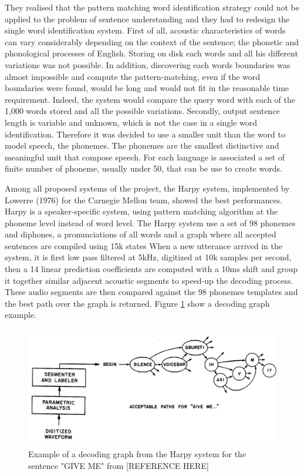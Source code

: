 They realised that the pattern matching word identification strategy could not be applied to the problem of sentence understanding and they had to redesign the single word identification system. First of all, acoustic characteristics of words can vary considerably depending on the context of the sentence; the phonetic and phonological processes of English. Storing on disk each  words and all his different variations was not possible. In addition, discovering each words boundaries was almost impossible and compute the pattern-matching, even if the word boundaries were found, would be long and would not fit in the reasonable time requirement. Indeed, the system would compare the query word with each of the 1,000 words stored and all the possible variations. Secondly, output sentence length is variable and unknown, which is not the case in a single word identification. Therefore it was decided to use a smaller unit than the word to model speech, the phonemes. The phonemes are the smallest distinctive and meaningful unit that compose speech. For each language is associated a set of finite number of phoneme, usually under 50, that can be use to create words.

Among all proposed systems of the project, the Harpy system, implemented by Lowerre (1976) for the Carnegie Mellon team, showed the best performances. Harpy is a speaker-specific  system, using pattern matching algorithm at the phoneme level instead of word level. The Harpy system  use a set of 98 phonemes and diphones, a pronunciations of all words and a graph where all accepted sentences are compiled using 15k states  When a new utterance arrived in the system, it is first low pass filtered at 5kHz, digitized at 10k samples per second, then a 14 linear prediction coefficients are computed with a 10ms shift and group it together similar adjacent acoustic segments to speed-up the decoding process. These audio segments are then compared against the 98 phonemes templates and the best path over the graph is returned. Figure \ref{harpy} show a decoding graph example.
\begin{figure}[h]
\includegraphics[width=\textwidth]{imgs/harpy.png}
\caption{Example of a decoding graph from the Harpy system for the sentence "GIVE ME" from [REFERENCE HERE]}
\label{harpy}
\end{figure}

